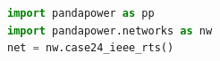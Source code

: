\documentclass[11pt]{article}
\begin{document}
\begin{lstlisting}[language=Python, caption=The network can be loaded directly from PandaPower.]
import pandapower as pp
import pandapower.networks as nw
net = nw.case24_ieee_rts()
\end{lstlisting}

\clearpage


%
%
\end{document}
